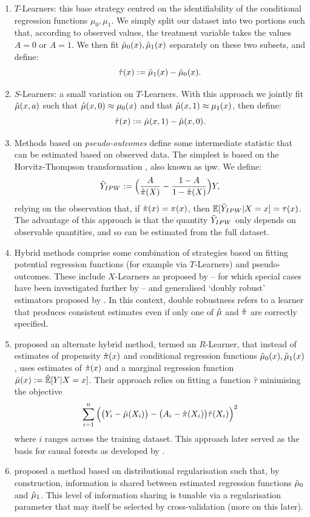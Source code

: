 \documentclass[../thesis.tex]{subfiles}
\begin{document}
\begin{enumerate}
    \item \label{tech:tlearner} $T$-Learners: this base strategy centred on the identifiability of the conditional regression functions $\mu_0, \mu_1$. We simply split our dataset into two portions such that, according to observed values, the treatment variable takes the values $A=0$ or $A=1$. We then fit $\hat{\mu}_0(x), \hat{\mu}_1(x)$ separately on these two subsets, and define:
    \[ \hat{\tau}(x) := \hat{\mu}_1(x) - \hat{\mu}_0(x).\]
    \item $S$-Learners: a small variation on $T$-Learners. With this approach we jointly fit $\hat{\mu}(x,a)$ such that $\hat{\mu}(x,0) \approx \mu_0(x)$ and that $\hat{\mu}(x, 1) \approx \mu_1(x)$, then define:
    \[\hat{\tau}(x) := \hat{\mu}(x,1) - \hat{\mu}(x,0).\]
    \item \label{tech:ipw} Methods based on \emph{pseudo-outcomes} define some intermediate statistic that can be estimated based on observed data. The simplest is based on the Horvitz-Thompson transformation \citep{horvitz_generalization_1952}, also known as \gls{ipw}. We define:
    \[\Tilde{Y}_{IPW} := \Big(\frac{A}{\hat{\pi}(X)} - \frac{1-A}{1-\hat{\pi}(X)}\Big)Y, \]
    relying on the observation that, if $\hat{\pi}(x) = \pi(x)$, then $\mathbb{E}[\Tilde{Y}_{IPW} | X =x] = \tau(x)$. The advantage of this approach is that the quantity $\Tilde{Y}_{IPW}$ only depends on observable quantities, and so can be estimated from the full dataset.
    \item Hybrid methods comprise some combination of strategies based on fitting potential regression functions (for example via $T$-Learners) and pseudo-outcomes. These include $X$-Learners as proposed by \citet{kunzel_metalearners_2019} -- for which special cases have been investigated further by \citet{curth_nonparametric_2021} -- and generalised `doubly robust' estimators proposed by \citet{kennedy_optimal_2020}. In this context, double robustness refers to a learner that produces consistent estimates even if only one of $\hat{\mu}$ and $\hat{\pi}$ are correctly specified.
    \item \citet{nie_learning_2017} proposed an alternate hybrid method, termed an $R$-Learner, that instead of estimates of propensity $\hat{\pi}(x)$ and conditional regression functions $\hat{\mu}_0(x), \hat{\mu}_1(x)$, uses estimates of $\hat{\pi}(x)$ and a marginal regression function $\hat{\mu}(x) := \hat{\mathbb{E}}[Y | X=x]$. Their approach relies on fitting a function $\hat{\tau}$ minimising the objective 
    \[ \sum_{i=1}^n \Big( \big(Y_i - \hat{\mu}(X_i)\big) - \big(A_i - \hat{\pi}(X_i)\big)\hat{\tau}(X_i)  \Big)^2 \]
    where $i$ ranges across the training dataset. This approach later served as the basis for causal forests as developed by \citet{athey_generalized_2019}. \label{eq:r_learner}
    \item \citet{shalit_estimating_2017} proposed a method based on distributional regularisation such that, by construction, information is shared between estimated regression functions $\hat{\mu}_0$ and $\hat{\mu}_1$. This level of information sharing is tunable via a regularisation parameter that may itself be selected by cross-validation (more on this later).
\end{enumerate}
\end{document}
